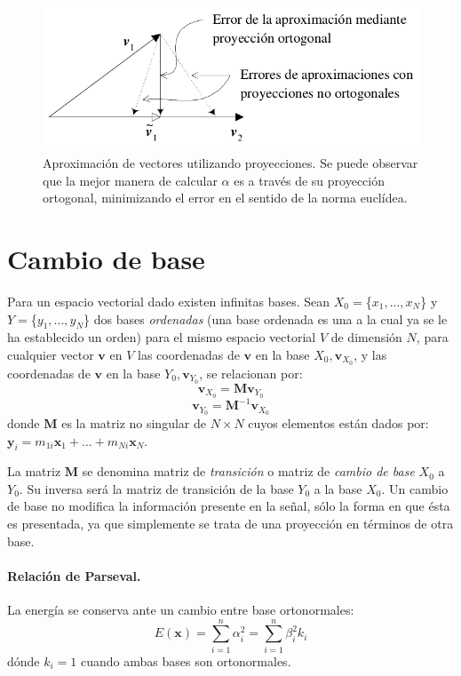 \documentclass[10pt,a4paper]{book}
\begin{document}
\begin{figure}[h!]
  \caption{Aproximación de vectores utilizando proyecciones. Se puede observar que la mejor manera de calcular $\alpha$ es a través de su proyección ortogonal, minimizando el error en el sentido de la norma euclídea.}
  \label{fig:orto_vectors}
  \centering
  \hbox{\includegraphics[width=\textwidth-\fboxrule-\fboxrule]{fig2.png}}
\end{figure}

\section{Cambio de base}
Para un espacio vectorial dado existen infinitas bases. Sean $X_0=$\{$x_1,...,x_N$\} y $Y=$\{$y_1,...,y_N$\} dos bases \textit{ordenadas} (una base ordenada es una a la cual ya se le ha establecido un orden) para el mismo espacio vectorial $V$ de dimensión $N$, para cualquier vector $\mathbf{v}$ en $V$ las coordenadas de $\mathbf{v}$ en la base $X_0, \mathbf{v}_{X_0}$, y las coordenadas de $\mathbf{v}$ en la base $Y_0, \mathbf{v}_{Y_0}$, se relacionan por:
\[\mathbf{v}_{X_0}=\mathbf{M v}_{Y_0}\]
\[\mathbf{v}_{Y_0}=\mathbf{M}^{-1} \mathbf{v}_{X_0}\]
donde $\mathbf{M}$ es la matriz no singular de $N \times N$ cuyos elementos están dados por: $\mathbf{y}_i=m_{1i}\mathbf{x}_1 + ... + m_{Ni}\mathbf{x}_N$.

La matriz $\mathbf{M}$ se denomina matriz de \textit{transición} o matriz de \textit{cambio de base} $X_0$ a $Y_0$. Su inversa será la matriz de transición de la base $Y_0$ a la base $X_0$. Un cambio de base no modifica la información presente en la señal, sólo la forma en que ésta es presentada, ya que simplemente se trata de una proyección en términos de otra base.

\paragraph{Relación de Parseval.} La energía se conserva ante un cambio entre base ortonormales:
\[E(\mathbf{x})=\sum_{i=1}^n \alpha_i^2=\sum_{i=1}^n \beta_i^2 k_i\]
dónde $k_i=1$ cuando ambas bases son ortonormales.
\end{document}
